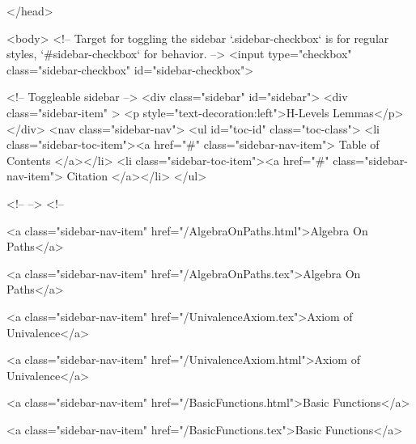   
</head>




  <body>
    <!-- Target for toggling the sidebar `.sidebar-checkbox` is for regular
     styles, `#sidebar-checkbox` for behavior. -->
<input type="checkbox" class="sidebar-checkbox" id="sidebar-checkbox">

<!-- Toggleable sidebar -->
<div class="sidebar" id="sidebar">
  <div class="sidebar-item" >
    <p style="text-decoration:left">H-Levels Lemmas</p>
  </div>
  <nav class="sidebar-nav">
    <ul id="toc-id" class="toc-class">
  <li class="sidebar-toc-item"><a href="#" class="sidebar-nav-item"> Table of Contents </a></li>
  <li class="sidebar-toc-item"><a href="#" class="sidebar-nav-item"> Citation </a></li>
</ul>


    <!--  -->
    <!-- 
      
    
      
    
      
    
      
        
      
    
      
        
          <a class="sidebar-nav-item" href="/AlgebraOnPaths.html">Algebra On Paths</a>
        
      
    
      
        
          <a class="sidebar-nav-item" href="/AlgebraOnPaths.tex">Algebra On Paths</a>
        
      
    
      
        
          <a class="sidebar-nav-item" href="/UnivalenceAxiom.tex">Axiom of Univalence</a>
        
      
    
      
        
          <a class="sidebar-nav-item" href="/UnivalenceAxiom.html">Axiom of Univalence</a>
        
      
    
      
        
          <a class="sidebar-nav-item" href="/BasicFunctions.html">Basic Functions</a>
        
      
    
      
        
          <a class="sidebar-nav-item" href="/BasicFunctions.tex">Basic Functions</a>
        
      
    
      
        
